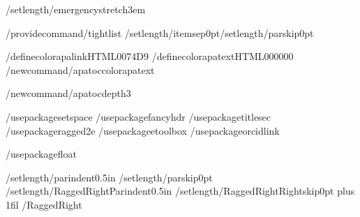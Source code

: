 /setlength{/emergencystretch}{3em} %

/providecommand{/tightlist}{%
  /setlength{/itemsep}{0pt}/setlength{/parskip}{0pt}}






%

/definecolor{apalink}{HTML}{0074D9}
/definecolor{apatext}{HTML}{000000}
/newcommand{/apatoccolor}{apatext}

/newcommand{/apatocdepth}{3}

/usepackage{setspace}
/usepackage{fancyhdr}
/usepackage{titlesec}
/usepackage{ragged2e}
/usepackage{etoolbox}
/usepackage{orcidlink}

/usepackage{float}

%
/setlength{/parindent}{0.5in}
/setlength{/parskip}{0pt}
/setlength{/RaggedRightParindent}{0.5in}
/setlength{/RaggedRightRightskip}{0pt plus 1fil}
/RaggedRight

